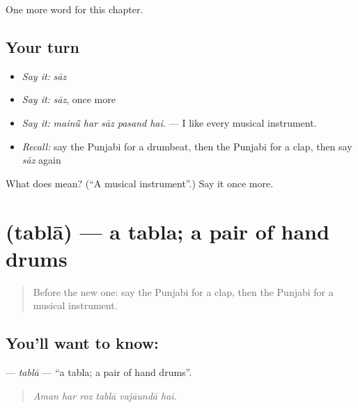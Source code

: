 \begin{grammarlens}[title={What you've built}]
One more word for this chapter.
\end{grammarlens}

\subsection*{Your turn}
\begin{itemize}
\raggedright
  \item \emph{Say it:} \emph{sāz}
  \item \emph{Say it:} \emph{sāz}, once more
  \item \emph{Say it:} \emph{mainū̃ har sāz pasand hai.} — I like every musical instrument.
  \item \emph{Recall:} say the Punjabi for a drumbeat, then the Punjabi for a clap, then say \emph{sāz} again
\end{itemize}

\begin{tcolorbox}[breakable,colback=teal!4,colframe=teal!35!black,title={Before you move on}]
What does  mean? (\textquotedblleft{}A musical instrument\textquotedblright{}.) Say it once more.
\end{tcolorbox}
\section[\texorpdfstring{\pa{ਤਬਲਾ} (tablā)}{ਤਬਲਾ (tablā)}]{ (tablā) — a tabla; a pair of hand drums}

\label{lesson:PA-C348-tabla}



\begin{quote}
Before the new one: say the Punjabi for a clap, then the Punjabi for a musical instrument.
\end{quote}

\subsection*{You'll want to know: }
\textbf{} — \emph{tablā} — \textquotedblleft{}a tabla; a pair of hand drums\textquotedblright{}.

\begin{quote}
     
\end{quote}

\begin{quote}
\emph{Aman har roz tablā vajāundā hai.}
\end{quote}

